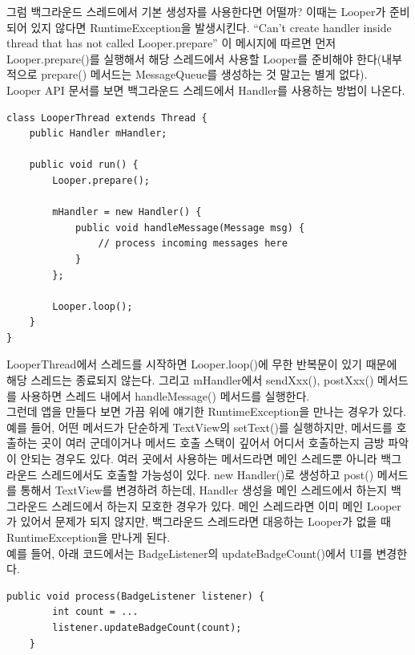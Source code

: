 그럼 백그라운드 스레드에서 기본 생성자를 사용한다면 어떨까? 이때는 Looper가 준비되어 있지 않다면 RuntimeException을 발생시킨다. 
``Can't create handler inside thread that has not called Looper.prepare''
이 메시지에 따르면 먼저 Looper.prepare()를 실행해서 해당 스레드에서 사용할 Looper를 준비해야 한다(내부적으로 prepare() 메서드는 MessageQueue를 생성하는 것 말고는 별게 없다).\\

Looper API 문서를 보면 백그라운드 스레드에서 Handler를 사용하는 방법이 나온다.

\begin{lstlisting}[frame=single, caption=LooperThead, label=src:LooperThread] 
class LooperThread extends Thread {
	public Handler mHandler;

	public void run() {
		Looper.prepare();

		mHandler = new Handler() {
        	public void handleMessage(Message msg) {
            	// process incoming messages here
			}
		};

		Looper.loop();
	}
}
\end{lstlisting}
LooperThread에서 스레드를 시작하면 Looper.loop()에 무한 반복문이 있기 때문에 해당 스레드는 종료되지 않는다. 
그리고 mHandler에서 sendXxx(), postXxx() 메서드를 사용하면 스레드 내에서 handleMessage() 메서드를 실행한다.\\

그런데 앱을 만들다 보면 가끔 위에 얘기한 RuntimeException을 만나는 경우가 있다.
예를 들어, 어떤 메서드가 단순하게 TextView의 setText()를 실행하지만, 메서드를 호출하는 곳이 여러 군데이거나 메서드 호출 스택이 깊어서 어디서 호출하는지 금방 파악이 안되는 경우도 있다.
여러 곳에서 사용하는 메서드라면 메인 스레드뿐 아니라 백그라운드 스레드에서도 호출할 가능성이 있다. 
new Handler()로 생성하고 post() 메서드를 통해서 TextView를 변경하려 하는데, Handler 생성을 메인 스레드에서 하는지 백그라운드 스레드에서 하는지 모호한 경우가 있다.
메인 스레드라면 이미 메인 Looper가 있어서 문제가 되지 않지만, 백그라운드 스레드라면 대응하는 Looper가 없을 때 RuntimeException을 만나게 된다.\\

예를 들어, 아래 코드에서는 BadgeListener의 updateBadgeCount()에서 UI를 변경한다.
\begin{lstlisting}[frame=single] 
	public void process(BadgeListener listener) {
		int count = ...
		listener.updateBadgeCount(count);
	}
\end{lstlisting}	

